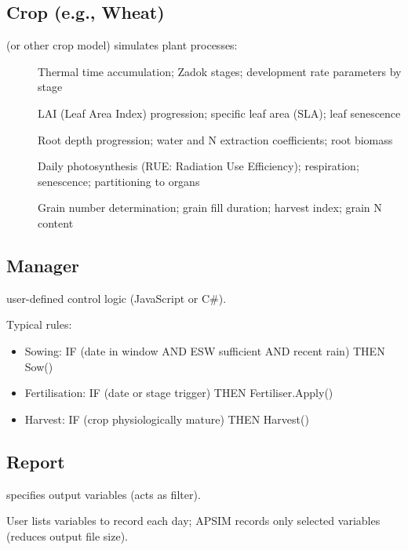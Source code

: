 \subsection{Crop (e.g., Wheat)}

 (or other crop model) simulates plant processes:

\begin{description}
  \item[] Thermal time accumulation; Zadok stages; development rate parameters by stage
  
  \item[] LAI (Leaf Area Index) progression; specific leaf area (SLA); leaf senescence
  
  \item[] Root depth progression; water and N extraction coefficients; root biomass
  
  \item[] Daily photosynthesis (RUE: Radiation Use Efficiency); respiration; senescence; partitioning to organs
  
  \item[] Grain number determination; grain fill duration; harvest index; grain N content
\end{description}

\subsection{Manager}

 user-defined control logic (JavaScript or C\#).

Typical rules:
\begin{itemize}
  \item Sowing: IF (date in window AND ESW sufficient AND recent rain) THEN Sow()
  \item Fertilisation: IF (date or stage trigger) THEN Fertiliser.Apply()
  \item Harvest: IF (crop physiologically mature) THEN Harvest()
\end{itemize}

\subsection{Report}

 specifies output variables (acts as filter).

User lists variables to record each day; APSIM records only selected variables (reduces output file size).

